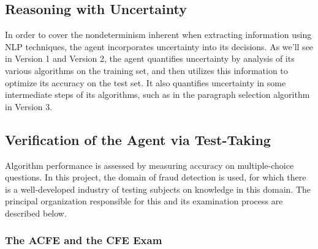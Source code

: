 

\subsection{Reasoning with Uncertainty}

In order to cover the nondeterminism inherent when extracting information using NLP techniques, the agent incorporates uncertainty into its decisions.  As we'll see in Version 1 and Version 2, the agent quantifies uncertainty by analysis of its various algorithms on the training set, and then utilizes this information to optimize its accuracy on the test set.  It also quantifies uncertainty in some intermediate steps of its algorithms, such as in the paragraph selection algorithm in Version 3.

\subsection{Verification of the Agent via Test-Taking}

Algorithm performance is assessed by measuring accuracy on multiple-choice questions.  In this project, the domain of fraud detection is used, for which there is a well-developed industry of testing subjects on knowledge in this domain.  The principal organization responsible for this and its examination process are described below.

\subsubsection{The ACFE and the CFE Exam}


